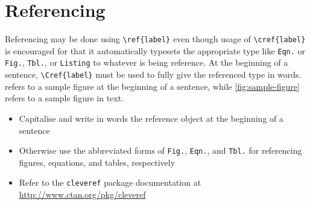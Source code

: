 \section{Referencing}\label{sec:referencing}

Referencing may be done using \verb|\ref{label}| even though usage of \verb|\cref{label}| is encouraged for that it automatically typesets the appropriate type like \texttt{Eqn.} or \texttt{Fig.}, \texttt{Tbl.}, or \texttt{Listing} to whatever is being reference. At the beginning of a sentence, \verb|\Cref{label}| must be used to fully give the referenced type in words.  refers to a sample figure at the beginning of a sentence, while \cref{fig:sample-figure} refers to a sample figure in text.

\begin{itemize}
    \item Capitalise and write in words the reference object at the beginning of a sentence
    \item Otherwise use the abbreviated forms of \texttt{Fig.}, \texttt{Eqn.}, and \texttt{Tbl.} for referencing figures, equations, and tables, respectively
    \item Refer to the \verb|cleveref| package documentation at \\\url{http://www.ctan.org/pkg/cleveref}
\end{itemize}
